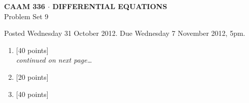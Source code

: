 \documentclass[10pt]{article}
\begin{document}

\begin{center}
\large \textsf{\textbf{CAAM 336 $\cdot$ DIFFERENTIAL EQUATIONS}\\[0.5em]
 Problem Set 9 }
\end{center}

Posted Wednesday 31 October 2012.  Due Wednesday 7 November 2012, 5pm.

\begin{enumerate}
\item {[40 points]}\\[-2em]  
  

\vspace*{-2em}
\hfill \emph{continued on next page\ldots}

\item {[20 points]}\\  

\item {[40 points]}\\  

\end{enumerate}
\end{document}
